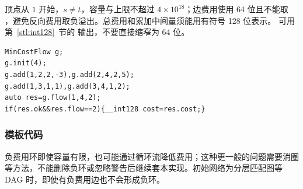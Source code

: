 顶点从 $1$ 开始，$s\ne t$，容量与上限不超过 $4\times10^{18}$；边费用使用 64 位且不能取 ，避免反向费用取负溢出。总费用和累加中间量须能用有符号 128 位表示。 可用第~\ref{stl:int128}~节的  输出，不要直接缩窄为 64 位。
\begin{lstlisting}[style=mtycpp,numbers=none]
MinCostFlow g;
g.init(4);
g.add(1,2,2,-3),g.add(2,4,2,5);
g.add(1,3,1,1),g.add(3,4,1,2);
auto res=g.flow(1,4,2);
if(res.ok&&res.flow==2){__int128 cost=res.cost;}
\end{lstlisting}

\subsubsection*{模板代码}

负费用环即使容量有限，也可能通过循环流降低费用；这种更一般的问题需要消圈等方法，不能删除负环或忽略警告后继续套本实现。初始网络为分层匹配图等 DAG 时，即使有负费用边也不会形成负环。
